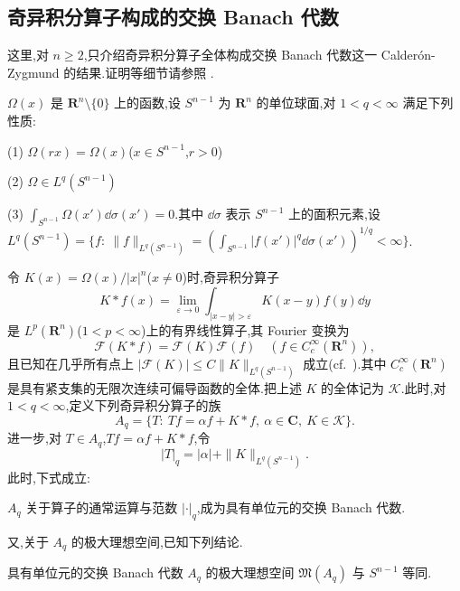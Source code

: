 \subsection{奇异积分算子构成的交换 Banach 代数}\label{sec:3.2.5}

这里,对 $n \geq 2$,只介绍奇异积分算子全体构成交换 Banach 代数这一 Calderón-Zygmund \cite{ch3:14} 的结果.证明等细节请参照 \cite{ch3:14}.

\begin{definition}\label{def:3.2.13}
$\Omega(x)$ 是 $\mathbf{R}^{n} \setminus \{0\}$ 上的函数,设 $S^{n-1}$ 为 $\mathbf{R}^{n}$ 的单位球面,对 $1 < q < \infty$ 满足下列性质:

(1) $\Omega(rx) = \Omega(x)$($x \in S^{n-1}$,$r > 0$)

(2) $\Omega \in L^{q}(S^{n-1})$

(3) $\int_{S^{n-1}}\Omega(x')\dd\sigma(x') = 0$.其中 $\dd\sigma$ 表示 $S^{n-1}$ 上的面积元素,设 $L^{q}(S^{n-1}) = \{f:\ \|f\|_{L^{q}(S^{n-1})} = \left(\int_{S^{n-1}}|f(x')|^{q}\dd\sigma(x')\right)^{1/q} < \infty\}$.
\end{definition}

令 $K(x) = \Omega(x)/|x|^{n}$($x \neq 0$)时,奇异积分算子
\begin{equation*}
K * f(x) = \lim_{\varepsilon \to 0}\int_{|x - y| > \varepsilon}K(x - y)f(y)\dd y
\end{equation*}
是 $L^{p}(\mathbf{R}^{n})$($1 < p < \infty$)上的有界线性算子,其 Fourier 变换为
\begin{equation*}
\mathcal{F}(K * f) = \mathcal{F}(K)\mathcal{F}(f) \quad \left(f \in C_{c}^{\infty}(\mathbf{R}^{n})\right),
\end{equation*}
且已知在几乎所有点上 $|\mathcal{F}(K)| \leq C\|K\|_{L^{q}(S^{n-1})}$ 成立(cf.\ \cite{ch3:5}).其中 $C_{c}^{\infty}(\mathbf{R}^{n})$ 是具有紧支集的无限次连续可偏导函数的全体.把上述 $K$ 的全体记为 $\mathcal{K}$.此时,对 $1 < q < \infty$,定义下列奇异积分算子的族
\begin{equation*}
A_{q} = \{T:\ Tf = \alpha f + K * f,\ \alpha \in \mathbf{C},\ K \in \mathcal{K}\}.
\end{equation*}
进一步,对 $T \in A_{q}$,$Tf = \alpha f + K * f$,令
\begin{equation*}
|T|_{q} = |\alpha| + \|K\|_{L^{q}(S^{n-1})}.
\end{equation*}
此时,下式成立:

\begin{theorem}\label{thm:3.2.14}
$A_{q}$ 关于算子的通常运算与范数 $|\cdot|_{q}$,成为具有单位元的交换 Banach 代数.
\end{theorem}

又,关于 $A_{q}$ 的极大理想空间,已知下列结论.

\begin{theorem}\label{thm:3.2.15}
具有单位元的交换 Banach 代数 $A_{q}$ 的极大理想空间 $\mathfrak{M}(A_{q})$ 与 $S^{n-1}$ 等同.
\end{theorem}

